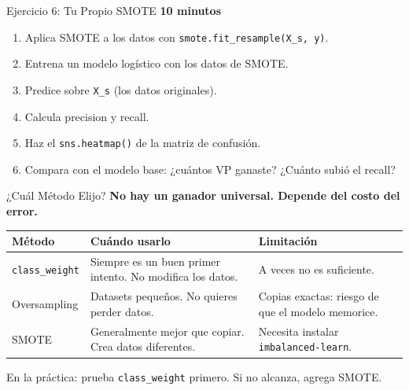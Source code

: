 \documentclass[aspectratio=169, 11pt]{beamer}
\begin{document}
\begin{frame}[shrink=5]{Ejercicio 6: Tu Propio SMOTE}
  \vspace{-4pt}
  {\footnotesize\color{arcaDark}\bfseries
    \faClock\hspace{4pt} 10 minutos}

  \vspace{6pt}
  {\footnotesize
  \begin{enumerate}\setlength{\itemsep}{5pt}
    \item Aplica SMOTE a los datos con
      \texttt{smote.fit\_resample(X\_s, y)}.
    \item Entrena un modelo logístico con los datos de SMOTE.
    \item Predice sobre \texttt{X\_s} (los datos originales).
    \item Calcula precision y recall.
    \item Haz el \texttt{sns.heatmap()} de la matriz de confusión.
    \item Compara con el modelo base: ¿cuántos VP ganaste?
      ¿Cuánto subió el recall?
  \end{enumerate}
  }
\end{frame}

\begin{frame}{¿Cuál Método Elijo?}
  \vspace{-4pt}
  {\footnotesize\color{arcaDark}\bfseries
    No hay un ganador universal. Depende del costo del error.}

  \vspace{8pt}
  {\scriptsize
  \begin{tabular}{@{}p{2.5cm}p{4cm}p{4cm}@{}}
    \toprule
    \textbf{Método} & \textbf{Cuándo usarlo} & \textbf{Limitación} \\
    \midrule
    \texttt{class\_weight} &
      Siempre es un buen primer intento.
      No modifica los datos. &
      A veces no es suficiente. \\[6pt]
    Oversampling &
      Datasets pequeños.
      No quieres perder datos. &
      Copias exactas: riesgo de
      que el modelo memorice. \\[6pt]
    SMOTE &
      Generalmente mejor que copiar.
      Crea datos diferentes. &
      Necesita instalar
      \texttt{imbalanced-learn}. \\
    \bottomrule
  \end{tabular}
  }

  \vspace{6pt}
  {\footnotesize\color{arcaDark}
    \faLightbulb\hspace{4pt}
    En la práctica: prueba \texttt{class\_weight} primero. Si no
    alcanza, agrega SMOTE.}
\end{frame}
\end{document}
